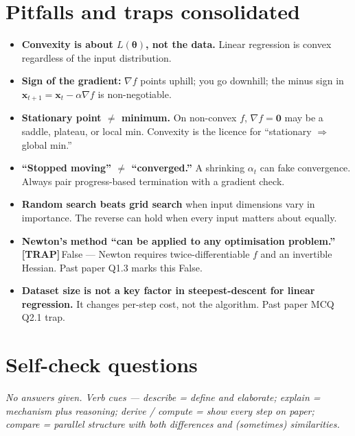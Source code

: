 \documentclass[11pt, a4paper]{article}
\newcommand{\trapflag}{\textcolor{trapBd}{\textbf{[TRAP]}}\,}
\begin{document}
\section*{Pitfalls and traps consolidated}

\begin{itemize}
  \item \textbf{Convexity is about $L(\boldsymbol\theta)$, not the data.} Linear regression is convex regardless of the input distribution.
  \item \textbf{Sign of the gradient:} $\nabla f$ points uphill; you go downhill; the minus sign in $\mathbf{x}_{t+1} = \mathbf{x}_t - \alpha\nabla f$ is non-negotiable.
  \item \textbf{Stationary point $\ne$ minimum.} On non-convex $f$, $\nabla f = \mathbf{0}$ may be a saddle, plateau, or local min. Convexity is the licence for ``stationary $\Rightarrow$ global min.''
  \item \textbf{``Stopped moving'' $\ne$ ``converged.''} A shrinking $\alpha_t$ can fake convergence. Always pair progress-based termination with a gradient check.
  \item \textbf{Random search beats grid search} when input dimensions vary in importance. The reverse can hold when every input matters about equally.
  \item \textbf{Newton's method ``can be applied to any optimisation problem.''} \trapflag{}False — Newton requires twice-differentiable $f$ and an invertible Hessian. Past paper Q1.3 marks this False.
  \item \textbf{Dataset size is not a key factor in steepest-descent for linear regression.} It changes per-step cost, not the algorithm. Past paper MCQ Q2.1 trap.
\end{itemize}

\section*{Self-check questions}

\textit{No answers given. Verb cues — \emph{describe} = define and elaborate; \emph{explain} = mechanism plus reasoning; \emph{derive} / \emph{compute} = show every step on paper; \emph{compare} = parallel structure with both differences and (sometimes) similarities.}
\end{document}
